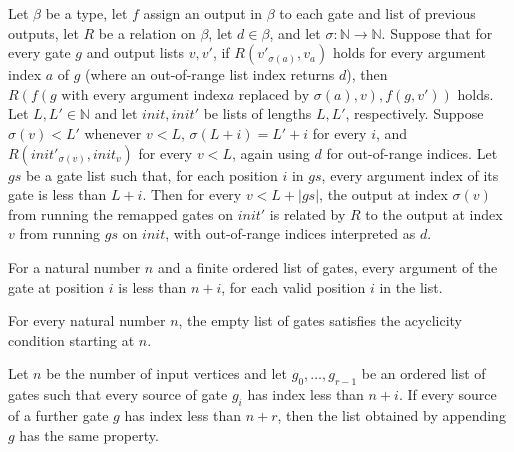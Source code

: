 \begin{theorem}
\label{BoolCircuit.runWith_remap_rel}
\leanok
{}
Let $\beta$ be a type, let $f$ assign an output in $\beta$ to each gate and list of
previous outputs, let $R$ be a relation on $\beta$, let $d\in\beta$, and let
$\sigma:\mathbb{N}\to\mathbb{N}$. Suppose that for every gate $g$ and output lists
$v,v'$, if $R(v'_{\sigma(a)},v_a)$ holds for every argument index $a$ of $g$ (where an
out-of-range list index returns $d$), then $R(f(g\text{ with every argument index
}a\text{ replaced by }\sigma(a),v),f(g,v'))$ holds. Let $L,L'\in\mathbb{N}$ and let
$init,init'$ be lists of lengths $L,L'$, respectively. Suppose $\sigma(v)<L'$ whenever
$v<L$, $\sigma(L+i)=L'+i$ for every $i$, and $R(init'_{\sigma(v)},init_v)$ for every
$v<L$, again using $d$ for out-of-range indices. Let $gs$ be a gate list such that, for
each position $i$ in $gs$, every argument index of its gate is less than $L+i$. Then for
every $v<L+|gs|$, the output at index $\sigma(v)$ from running the remapped gates on
$init'$ is related by $R$ to the output at index $v$ from running $gs$ on $init$, with
out-of-range indices interpreted as $d$.
\end{theorem}

\begin{definition}
\label{BoolCircuit.GatesAcyclic}
\leanok
{}
For a natural number $n$ and a finite ordered list of gates, every argument of the gate
at position $i$ is less than $n+i$, for each valid position $i$ in the list.
\end{definition}

\begin{theorem}
\label{BoolCircuit.GatesAcyclic.nil}
\leanok
{}
For every natural number $n$, the empty list of gates satisfies the acyclicity condition
starting at $n$.
\end{theorem}

\begin{theorem}
\label{BoolCircuit.GatesAcyclic.snoc}
\leanok
{}
Let $n$ be the number of input vertices and let $g_0,\ldots,g_{r-1}$ be an ordered list
of gates such that every source of gate $g_i$ has index less than $n+i$. If every source
of a further gate $g$ has index less than $n+r$, then the list obtained by appending $g$
has the same property.
\end{theorem}

